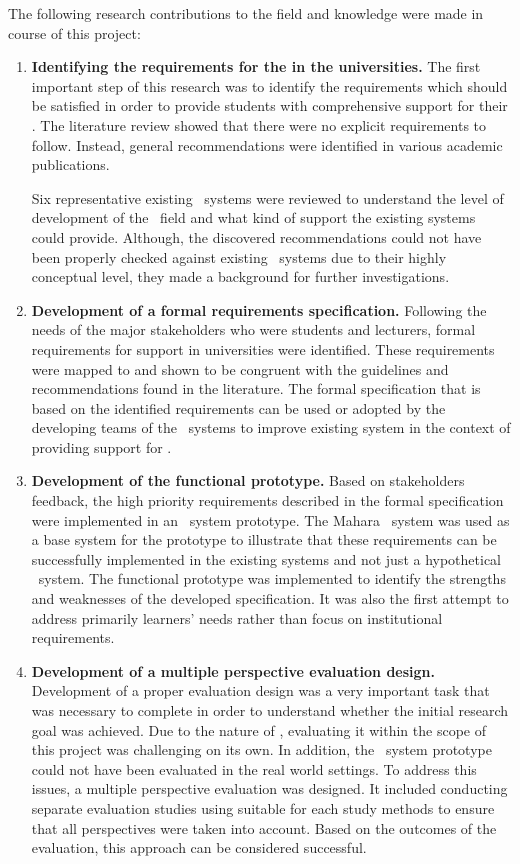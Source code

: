 The following research contributions to the field and knowledge were made in
course of this project:
\begin{enumerate}
  \item \textbf{Identifying the requirements for the \LLLs in the universities.}
  The first important step of this research was to identify the requirements
  which should be satisfied in order to provide students with comprehensive
  support for their \LLLsn. The literature review showed that there were no
  explicit requirements to follow. Instead, general recommendations were
  identified in various academic publications. 
  
  Six representative existing \ep~systems were reviewed to understand the
  level of development of the \ep~field and what kind of \LLLs support the
  existing systems could provide. Although, the discovered recommendations could
  not have been properly checked against existing \ep~systems due to their
  highly conceptual level, they made a background for further investigations.
  
  \item \textbf{Development of a formal requirements specification.} Following
  the needs of the major stakeholders who were students and lecturers, formal
  requirements for \LLLs support in universities were identified. These
  requirements were mapped to and shown to be congruent with the guidelines and
  recommendations found in the literature. The formal specification that is
  based on the identified requirements can be used or adopted by the developing
  teams of the \ep~systems to improve existing system in the context of
  providing support for \LLLsn.
  
  \item \textbf{Development of the functional prototype.} Based on stakeholders
  feedback, the high priority requirements described in the formal specification
  were implemented in an \ep~system prototype. The Mahara \ep~system was used as
  a base system for the prototype to illustrate that these requirements can be
  successfully implemented in the existing systems and not just a hypothetical
  \ep~system. The functional prototype was implemented to identify the strengths
  and weaknesses of the developed specification. It was also the first attempt
  to address primarily learners' needs rather than focus on institutional
  requirements.
  
  \item \textbf{Development of a multiple perspective evaluation design.}
  Development of a proper evaluation design was a very important task that was
  necessary to complete in order to understand whether the initial research goal
  was achieved. Due to the nature of \LLLsn, evaluating it within the scope of
  this project was challenging on its own. In addition, the \ep~system prototype
  could not have been evaluated in the real world settings. To address this
  issues, a multiple perspective evaluation was designed. It included conducting
  separate evaluation studies using suitable for each study methods to ensure
  that all perspectives were taken into account. Based on the outcomes of the
  evaluation, this approach can be considered successful.
\end{enumerate}

